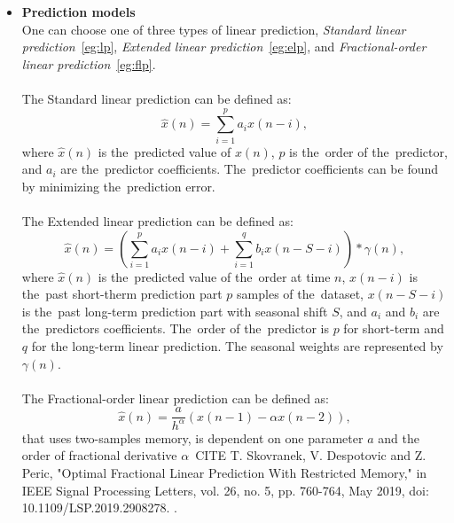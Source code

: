         \begin{itemize}
            \item \textbf{Prediction models}\\
            One can choose one of three types of linear prediction, \emph{Standard linear prediction}~\ref{eg:lp}, \emph{Extended linear prediction}~\ref{eg:elp},
            and \emph{Fractional-order linear prediction}~\ref{eg:flp}.\\
      \\
     The Standard linear prediction can be defined as:
                 \begin{equation}\label{eg:lp}
                \hat{x}(n) = \sum_{i=1}^{p} a_i x(n-i),
                \label{eq:linear-predictor}
            \end{equation}
            where $\hat{x}(n)$ is the~predicted value of $x(n)$, $p$ is the~order of the~predictor, and $a_i$ are the~predictor coefficients. The~predictor coefficients can be found by minimizing the~prediction error.
                        \\
                        \\
    The Extended linear prediction can be defined as:
%
                 \begin{equation}\label{eg:elp}
                \hat{x}(n) = \left(\sum_{i=1}^{p} a_i x(n-i) + \sum_{i=1}^{q} b_i x(n-S-i)\right) * \gamma(n),
            \end{equation}
            where $\hat{x}(n)$ is the~predicted value of the~order at time $n$, $x(n-i)$ is the~past short-therm prediction part $p$ samples of the~dataset, $x(n-S-i)$ is the~past long-term prediction part with seasonal shift $S$, and $a_i$ and $b_i$ are the~predictors coefficients. The~order of the~predictor is $p$ for short-term and $q$ for the long-term linear prediction. The seasonal weights are represented by $\gamma(n)$.\\
                                    \\
    The Fractional-order linear prediction can be defined as:
            \\
            \begin{equation}\label{eg:flp}
                \hat{x}(n) = \frac{a}{h^\alpha}(x(n-1) - \alpha x(n-2)),
                \label{eq:linear-predictor}
            \end{equation}
            that uses two-samples memory, is dependent on one parameter $a$ and the order of fractional derivative $\alpha$~CITE T. Skovranek, V. Despotovic and Z. Peric, "Optimal Fractional Linear Prediction With Restricted Memory," in IEEE Signal Processing Letters, vol. 26, no. 5, pp. 760-764, May 2019, doi: 10.1109/LSP.2019.2908278.
.
           

\end{itemize}
